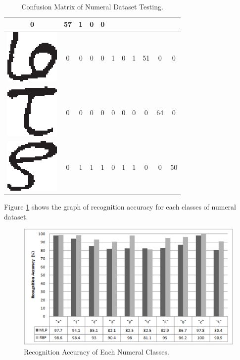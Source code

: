 \begin{table}[h]
\begin{tabular}{|c|c|c|c|c|c|c|c|c|c|c|}
0 & 57 & 1 & 0 & 0\tabularnewline
\hline
\includegraphics[scale=0.25]{figures/datasets/nhcr/numerals/seven} & 0 & 0 & 0 & 0 & 1 & 0 & 1 & 51 & 0 & 0\tabularnewline
\hline
\includegraphics[scale=0.25]{figures/datasets/nhcr/numerals/eight} & 0 & 0 & 0 & 0 & 0 & 0 & 0 & 0 & 64 & 0\tabularnewline
\hline
\includegraphics[scale=0.25]{figures/datasets/nhcr/numerals/nine} & 0 & 1 & 1 & 1 & 0 & 1 & 1 & 0 & 0 & 50\tabularnewline
\hline
\end{tabular}
\caption{Confusion Matrix of Numeral Dataset Testing.}
\label{table_numeral_cm}
\end{table}

Figure \ref{figure_recognition_accuracy_numerals} shows the graph of recognition accuracy for each classes of numeral dataset.
\begin{figure}[h]
\centering
\includegraphics[scale=0.60]{figures/experiments/recognition_accuracy_numerals.eps}
\caption{Recognition Accuracy of Each Numeral Classes.}
\label{figure_recognition_accuracy_numerals}
\end{figure}

